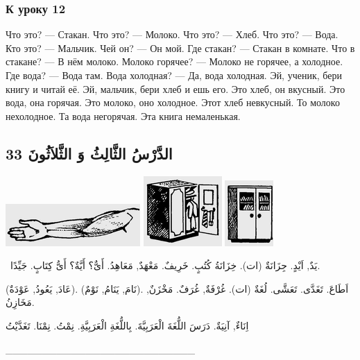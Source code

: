 \documentclass[a5paper]{article}
\begin{document}
\subsubsection{К уроку 12}
Что это? — Стакан. Что это? — Молоко. Что это? — Хлеб. Что это? — Вода. Кто это? — Мальчик. Чей он? — Он мой. Где ста­кан? — Стакан в комнате. Что в стакане? — В нём молоко. Молоко горячее? — Молоко не горячее, а холодное. Где вода? — Вода там. Вода холодная? — Да, вода холодная. Эй, ученик, бери книгу и читай её. Эй, мальчик, бери хлеб и ешь его. Это хлеб, он вкусный. Это вода, она горячая. Это молоко, оно холодное. Этот хлеб невкусный. То молоко нехолодное. Та вода негорячая. Эта книга немаленькая.

\subsection{الدَّرْسُ الثَّالِثُ وَ الثَّلاَثُونَ 33}
 \includegraphics[width=2.0209in,height=0.6354in]{images/MuhammadBagauddinprettified-img073.png}   \includegraphics[width=1.1772in,height=1.052in]{images/MuhammadBagauddinprettified-img074.png}   \includegraphics[width=0.7291in,height=0.9898in]{images/MuhammadBagauddinprettified-img075.png} 

\ يَدٌ, اَيْدٍ. جِزَانَةٌ (ات). خِزَانَةُ كُتُبٍ. خَرِيفٌ. مَعْهَدٌ, مَعَاهِدُ. أَىٌّ؟ أَيَّةٌ؟ أَىُّ كِتَابٍ. جَيِّدًا. 

(عَادَ, يَعُودُ, عَوْدَةٌ). (نَامَ, يَنَامُ, نَوْمٌ). اَطَاعَ. تَغَدَّى. تَعَشَّى. لُغَةٌ (ات). غُرْفَةٌ, غُرَفٌ. مَخْزَنٌ, مَخَازِنُ. 

اِنَاءٌ, آنِيَةٌ. دَرَسَ اللُّغَةَ الْعَرَبِيَّةَ. بِاللُّغَةِ الْعَرَبِيَّةِ. نِمْتُ. نِمْنَا. تَغَدَّيْتُ

\_\_\_\_\_\_\_\_\_\_\_\_\_\_\_\_\_\_\_\_\_\_\_\_\_\_
\end{document}

